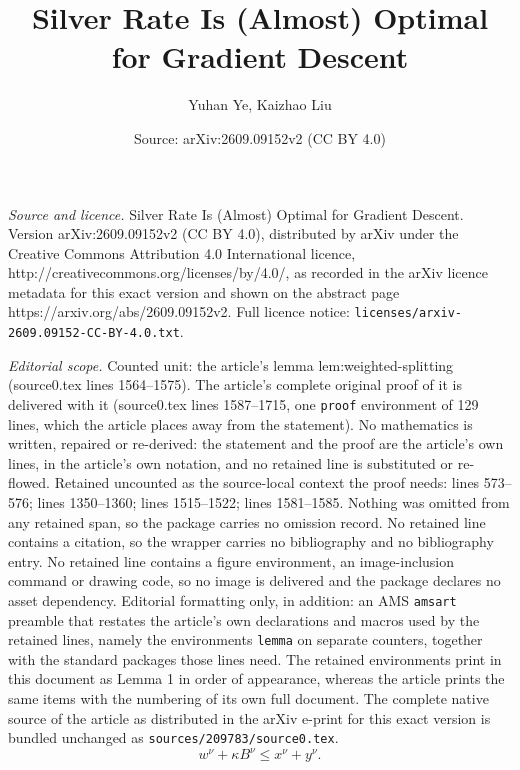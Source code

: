 \documentclass[10pt,a4paper]{amsart}
\title{Silver Rate Is (Almost) Optimal for Gradient Descent}
\author{Yuhan Ye, Kaizhao Liu}
\date{Source: arXiv:2609.09152v2 (CC BY 4.0)}
\begin{document}
\maketitle

\noindent\emph{Source and licence.} Silver Rate Is (Almost) Optimal for Gradient Descent. Version arXiv:2609.09152v2 (CC BY 4.0), distributed by arXiv under the Creative Commons Attribution 4.0 International licence, http://creativecommons.org/licenses/by/4.0/, as recorded in the arXiv licence metadata for this exact version and shown on the abstract page https://arxiv.org/abs/2609.09152v2. Full licence notice: \texttt{licenses/arxiv-2609.09152-CC-BY-4.0.txt}.\par\smallskip

\noindent\textit{Editorial scope.} Counted unit: the article's lemma lem:weighted-splitting (source0.tex lines 1564--1575). The article's complete original proof of it is delivered with it (source0.tex lines 1587--1715, one \texttt{proof} environment of 129 lines, which the article places away from the statement). No mathematics is written, repaired or re-derived: the statement and the proof are the article's own lines, in the article's own notation, and no retained line is substituted or re-flowed.  Retained uncounted as the source-local context the proof needs: lines 573--576; lines 1350--1360; lines 1515--1522; lines 1581--1585.  Nothing was omitted from any retained span, so the package carries no omission record.  No retained line contains a citation, so the wrapper carries no bibliography and no bibliography entry.  No retained line contains a figure environment, an image-inclusion command or drawing code, so no image is delivered and the package declares no asset dependency.  Editorial formatting only, in addition: an AMS \texttt{amsart} preamble that restates the article's own declarations and macros used by the retained lines, namely the environments \texttt{lemma} on separate counters, together with the standard packages those lines need.  The retained environments print in this document as Lemma 1 in order of appearance, whereas the article prints the same items with the numbering of its own full document.  The complete native source of the article as distributed in the arXiv e-print for this exact version is bundled unchanged as \texttt{sources/209783/source0.tex}.
\begin{equation}
  w^\nu+\kappa B^\nu\le x^\nu+y^\nu.
  \label{global:eq-scalar-hypothesis}
\end{equation}
\end{document}
